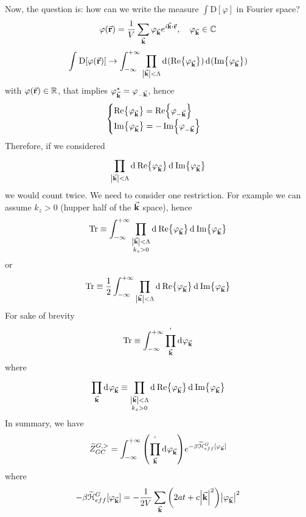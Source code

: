 \documentclass[../main/main.tex]{subfiles}
\begin{document}
Now, the question is: how can we write the measure \( \int \text{D}[\varphi ] \) in Fourier space?
\begin{equation}
  \varphi (\va{r}) = \frac{1}{V} \sum_{\va{k}}^{} \varphi _{\va{k}} e^{i \va{k} \vdot \va{r}}, \quad \varphi _{\va{k}} \in \mathbb{C}
\end{equation}
\begin{equation}
  \int_{}^{} \text{D} \qty[\varphi (\va{r})] \rightarrow \int_{- \infty }^{+ \infty } \prod_{\abs{\va{k}} < \Lambda  }^{}   \dd[]{(\Re{\varphi _{\va{k}}})}   \dd[]{(\Im{\varphi _{\va{k}}})}
\end{equation}
with \( \varphi (\va{r}) \in \mathbb{R} \), that implies \(    \varphi _{\va{k}}^* = \varphi _{-\va{k}}\), hence
\begin{equation}
  \begin{cases}
   \Re {\varphi _{\va{k}}} = \Re {\varphi _{-\va{k}}} \\
  \Im{\varphi _{\va{k}}} = -\Im {\varphi _{-\va{k}}}
  \end{cases}
\end{equation}
Therefore, if we considered
\begin{equation}
  \prod_{\abs{\va{k}} < \Lambda  }^{} \dd[]{\Re {\varphi _{\va{k}}}} \dd[]{\Im{\varphi _{\va{k}}}}
\end{equation}
we would count twice. We need to consider one restriction. For example we can assume
\( k_z > 0 \) (hupper half of the \( \va{k} \) space), hence
\begin{equation}
  \Tr \equiv \int_{- \infty }^{+ \infty } \prod_{\substack{ \abs{\va{k}} < \Lambda   \\ k_z > 0 } }^{}   \dd[]{\Re {\varphi _{\va{k}}}}  \dd[]{\Im {\varphi _{\va{k}}}}
\end{equation}
or
\begin{equation}
  \Tr \equiv \frac{1}{2} \int_{- \infty }^{+ \infty } \prod_{\substack{ \abs{\va{k}} < \Lambda    } }^{}   \dd[]{\Re {\varphi _{\va{k}}}}  \dd[]{\Im {\varphi _{\va{k}}}}
\end{equation}
For sake of brevity
\begin{equation}
  \Tr \equiv \int_{-\infty }^{+\infty } \prod_{\va{k}}^{'}  \dd[]{\varphi _{\va{k}}}
\end{equation}
where
\begin{equation}
  \prod_{\va{k}}^{} \dd[]{\varphi _{\va{k}}} \equiv \prod_{\substack{ \abs{\va{k}} < \Lambda   \\ k_z >0 } }^{}   \dd[]{\Re {\varphi _{\va{k}}}}  \dd[]{\Im {\varphi _{\va{k}}}}
\end{equation}
In summary, we have
\begin{equation}
  \widetilde{Z}_{GC}^{G,>} =  \int_{- \infty }^{+ \infty }  \qty( \prod_{\va{k}}^{'}  \dd[]{\varphi _{\va{k}}})
  e^{- \beta \widetilde{\mathcal{H}}_{eff}^G [\varphi _{\va{k}}] }
\end{equation}
where
\begin{equation}
  - \beta \widetilde{\mathcal{H}}_{eff}^G [\varphi _{\va{k}}] = - \frac{1}{2V} \sum_{\va{k}}^{} \qty(2at+c \abs{\va{k}}^2 ) \abs{\varphi _{\va{k}}}^2
\end{equation}
\end{document}
